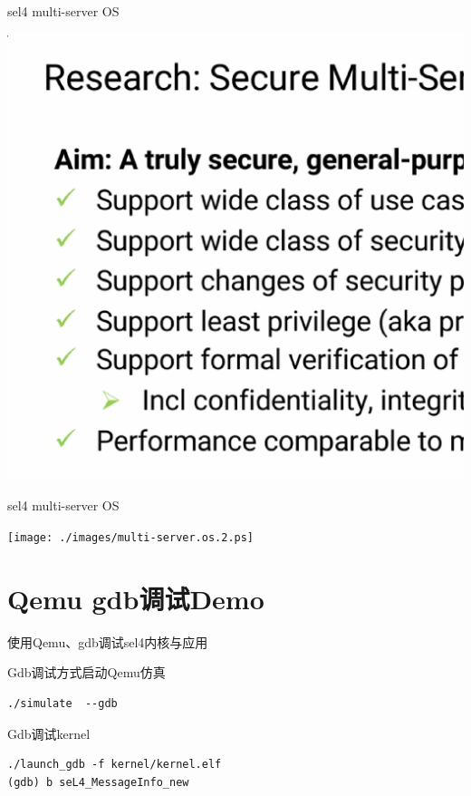 \documentclass[presentation,dvipdfmx,CJKbookmarks]{beamer}
\begin{document}
\begin{CJK*}{UTF8}{simsun}
\begin{frame}[label={sec:org07c2f00}]{sel4 multi-server OS}
\begin{center}
\includegraphics[width=.9\linewidth]{./images/multi-server.os.ps}
\end{center}
\end{frame}

\begin{frame}[label={sec:orgd2be28c}]{sel4 multi-server OS}
\begin{center}
\texttt{[image: ./images/multi-server.os.2.ps]}
\end{center}
\end{frame}

\section{Qemu gdb\thinspace 调试\thinspace Demo}
\label{sec:org248c233}
\begin{frame}[label={sec:orgcf654ce},fragile]{使用\thinspace Qemu、gdb\thinspace 调试\thinspace sel4\thinspace 内核与应用}
 \begin{block}{Gdb\thinspace 调试方式启动\thinspace Qemu\thinspace 仿真}
\begin{verbatim}
./simulate  --gdb
\end{verbatim}
\end{block}

\begin{block}{Gdb\thinspace 调试\thinspace kernel}
\begin{verbatim}
./launch_gdb -f kernel/kernel.elf
(gdb) b seL4_MessageInfo_new
\end{verbatim}
\end{block}


\end{frame}
\end{CJK*}
\end{document}
